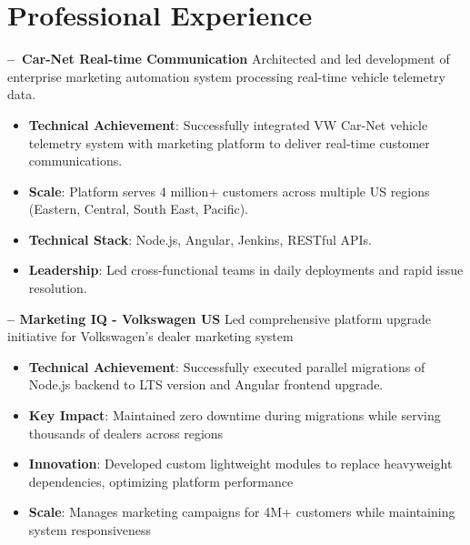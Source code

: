 \section{Professional Experience}

\begin{sectionContainer}
	\noindent\large\textbf{– Car-Net Real-time Communication}
	\vspace{0.8em} \newline
	\noindent Architected and led development of enterprise marketing automation system processing real-time vehicle telemetry data.
	\begin{itemize}[leftmargin=*, nosep, itemsep=0.4em, before=\vspace{0.6em}, after=\vspace{0.8em}, label={}]
		\item \textbf{Technical Achievement}: Successfully integrated VW Car-Net vehicle telemetry system with marketing platform to deliver real-time customer communications.
		\item \textbf{Scale}: Platform serves 4 million+ customers across multiple US regions (Eastern, Central, South East, Pacific).
		\item \textbf{Technical Stack}: Node.js, Angular, Jenkins, RESTful APIs.
		\item \textbf{Leadership}: Led cross-functional teams in daily deployments and rapid issue resolution.
	\end{itemize}
\end{sectionContainer}

\begin{sectionContainer}
	\vspace{0.4em}\noindent\large\textbf{– Marketing IQ - Volkswagen US}
	\vspace{0.8em} \newline
	\noindent Led comprehensive platform upgrade initiative for Volkswagen's dealer marketing system
	\begin{itemize}[leftmargin=*, nosep, itemsep=0.4em, before=\vspace{0.6em}, after=\vspace{0.8em}, label={}]
		\item \textbf{Technical Achievement}: Successfully executed parallel migrations of Node.js backend to LTS version and Angular frontend upgrade.
		\item \textbf{Key Impact}: Maintained zero downtime during migrations while serving thousands of dealers across regions
		\item \textbf{Innovation}: Developed custom lightweight modules to replace heavyweight dependencies, optimizing platform performance
		\item \textbf{Scale}: Manages marketing campaigns for 4M+ customers while maintaining system responsiveness
	\end{itemize}
\end{sectionContainer}

